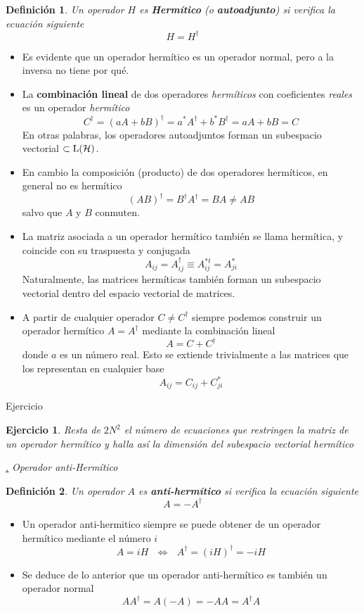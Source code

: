 \documentclass[a4paper,11pt]{book} %
\newtheorem{definicion_contador}{Definición}
\newcommand{\Definicion}[1]{
		\begin{mybox_gray2}{}
			\begin{definicion_contador}
				 #1 
			\end{definicion_contador} 
		\end{mybox_gray2}
	}
\newtheorem{ejercicio_contador}{Ejercicio}
\newcommand{\Ejercicio}[1]{
		\begin{mybox_gray}{Ejercicio} 
			\begin{ejercicio_contador}
				 #1 
			\end{ejercicio_contador} 
		\end{mybox_gray}
	}
\numberwithin{equation}{chapter}
\def\subsubiContadorIt{\par\addtocounter{subsubsection}{1}\underline{\it\thesubsubsection.}\hskip0.5cm \setcounter{subsubsubsectionIt}{0}}
\newcommand{\SubsubiIt}[1]{
		\subsubiContadorIt \textit{#1}
	}
\newcounter{subsubsubsectionIt}[subsubsection]
\begin{document}
\Definicion{
Un operador  $H$ es \textbf{Hermítico} (o \textbf{autoadjunto})  si  verifica la ecuación siguiente
	\begin{equation}
	H = H^\dagger
	\end{equation}
}
\begin{itemize}
	\item Es evidente que un operador hermítico es un operador normal, pero a la inversa no tiene por qué.
	\item La \textbf{combinación lineal} de dos operadores \textit{hermíticos} con coeficientes \textit{reales} es un operador \textit{hermítico}
$$
C^\dagger = (a A + b B)^\dagger = a^* A^\dagger + b^* B^\dagger = aA + b B = C
$$
En otras palabras, los operadores autoadjuntos forman un subespacio vectorial $\subset {\rm L}(\mathcal{H})$.

	\item En cambio la composición (producto) de dos operadores hermíticos, en general no es hermítico
	$$
	(A B)^\dagger = B^\dagger A^\dagger = BA \neq AB
	$$
	salvo que $A$ y $B$ conmuten.
	
	\item La matriz asociada a un operador hermítico también se llama hermítica, y coincide con su traspuesta y conjugada
$$
A_{ij} = A^\dagger_{ij} \equiv  A^{*t}_{ij} = A^*_{ji} 
$$
Naturalmente, las matrices hermíticas también forman un subespacio vectorial dentro del espacio vectorial de matrices. 
	\item A partir de cualquier operador $C\neq C^\dagger $ siempre podemos construir un operador hermítico $A=A^\dagger$ mediante la combinación lineal
$$
A = C + C^\dagger
$$
donde $a$ es un número real. Esto se extiende trivialmente a las matrices que los representan en cualquier base
$$
A_{ij} = C_{ij} + C_{ji}^*
$$ 
\end{itemize}

	\Ejercicio{Resta de $2N^2$ el número de ecuaciones que restringen la matriz de un operador hermítico y halla así la dimensión del \textit{subespacio vectorial hermítico}}
	

			\SubsubiIt{Operador anti-Hermítico}

\Definicion{
Un operador  $A$ es \textbf{anti-hermítico} si  verifica la ecuación siguiente
	\begin{equation}
	A = -A^\dagger
	\end{equation}
}
\begin{itemize}
	\item Un operador anti-hermitico siempre se puede obtener de un operador hermítico mediante el número $i$
	\begin{equation}
	A = i H ~~~\Longleftrightarrow ~~~A^\dagger = (i H)^\dagger = -i H
	\end{equation}
	\item Se deduce de lo anterior que un operador anti-hermítico es también un operador normal
	\begin{equation}
	A A^\dagger = A (-A) = -A A = A^\dagger A
	\end{equation}

\end{itemize}
\end{document}
